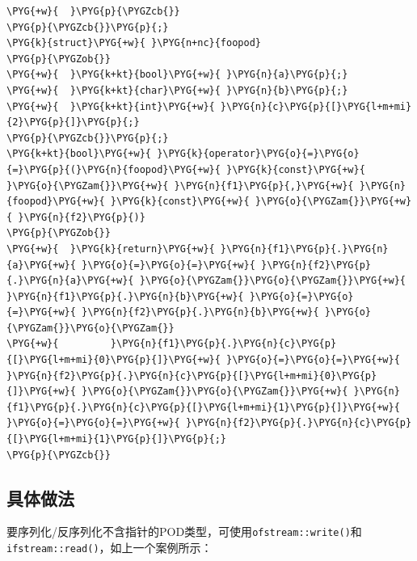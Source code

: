 \begin{codeblockbg}
\begin{Verbatim}[commandchars=\\\{\},breaklines=true,breakanywhere=true,fontsize=\codefont,xleftmargin=17bp]
\PYG{+w}{  }\PYG{p}{\PYGZcb{}}
\PYG{p}{\PYGZcb{}}\PYG{p}{;}
\PYG{k}{struct}\PYG{+w}{ }\PYG{n+nc}{foopod}
\PYG{p}{\PYGZob{}}
\PYG{+w}{  }\PYG{k+kt}{bool}\PYG{+w}{ }\PYG{n}{a}\PYG{p}{;}
\PYG{+w}{  }\PYG{k+kt}{char}\PYG{+w}{ }\PYG{n}{b}\PYG{p}{;}
\PYG{+w}{  }\PYG{k+kt}{int}\PYG{+w}{ }\PYG{n}{c}\PYG{p}{[}\PYG{l+m+mi}{2}\PYG{p}{]}\PYG{p}{;}
\PYG{p}{\PYGZcb{}}\PYG{p}{;}
\PYG{k+kt}{bool}\PYG{+w}{ }\PYG{k}{operator}\PYG{o}{=}\PYG{o}{=}\PYG{p}{(}\PYG{n}{foopod}\PYG{+w}{ }\PYG{k}{const}\PYG{+w}{ }\PYG{o}{\PYGZam{}}\PYG{+w}{ }\PYG{n}{f1}\PYG{p}{,}\PYG{+w}{ }\PYG{n}{foopod}\PYG{+w}{ }\PYG{k}{const}\PYG{+w}{ }\PYG{o}{\PYGZam{}}\PYG{+w}{ }\PYG{n}{f2}\PYG{p}{)}
\PYG{p}{\PYGZob{}}
\PYG{+w}{  }\PYG{k}{return}\PYG{+w}{ }\PYG{n}{f1}\PYG{p}{.}\PYG{n}{a}\PYG{+w}{ }\PYG{o}{=}\PYG{o}{=}\PYG{+w}{ }\PYG{n}{f2}\PYG{p}{.}\PYG{n}{a}\PYG{+w}{ }\PYG{o}{\PYGZam{}}\PYG{o}{\PYGZam{}}\PYG{+w}{ }\PYG{n}{f1}\PYG{p}{.}\PYG{n}{b}\PYG{+w}{ }\PYG{o}{=}\PYG{o}{=}\PYG{+w}{ }\PYG{n}{f2}\PYG{p}{.}\PYG{n}{b}\PYG{+w}{ }\PYG{o}{\PYGZam{}}\PYG{o}{\PYGZam{}}
\PYG{+w}{         }\PYG{n}{f1}\PYG{p}{.}\PYG{n}{c}\PYG{p}{[}\PYG{l+m+mi}{0}\PYG{p}{]}\PYG{+w}{ }\PYG{o}{=}\PYG{o}{=}\PYG{+w}{ }\PYG{n}{f2}\PYG{p}{.}\PYG{n}{c}\PYG{p}{[}\PYG{l+m+mi}{0}\PYG{p}{]}\PYG{+w}{ }\PYG{o}{\PYGZam{}}\PYG{o}{\PYGZam{}}\PYG{+w}{ }\PYG{n}{f1}\PYG{p}{.}\PYG{n}{c}\PYG{p}{[}\PYG{l+m+mi}{1}\PYG{p}{]}\PYG{+w}{ }\PYG{o}{=}\PYG{o}{=}\PYG{+w}{ }\PYG{n}{f2}\PYG{p}{.}\PYG{n}{c}\PYG{p}{[}\PYG{l+m+mi}{1}\PYG{p}{]}\PYG{p}{;}
\PYG{p}{\PYGZcb{}}
\end{Verbatim}
\end{codeblockbg}



\subsection{具体做法}



要序列化/反序列化不含指针的POD类型，可使用\texttt{ofstream::\allowbreak{}write()}和\texttt{ifstream::\allowbreak{}read()}，如上一个案例所示：



